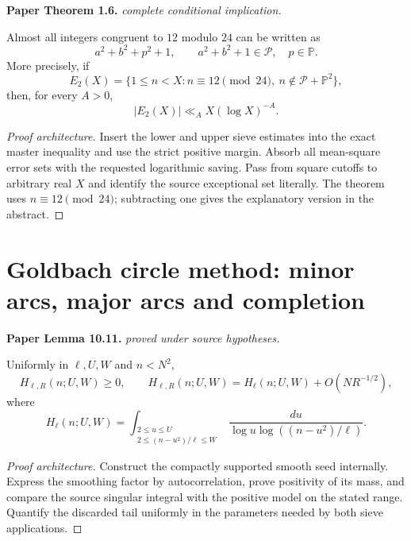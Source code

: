 \begin{theorem}
\label{goldbach_exceptional_set}
\leanok
\par\medskip\noindent\textbf{Paper Theorem 1.6.} \textit{complete conditional implication.}\par
Almost all integers congruent to $12$ modulo $24$ can be written as
\[
 a^2+b^2+p^2+1,
 \qquad a^2+b^2+1\in\mathcal P,\quad p\in\mathbb P.
\]
More precisely, if
\[
 E_2(X)=\{1\leq n<X:n\equiv12\pmod{24},\
 n\notin\mathcal P+\mathbb P^2\},
\]
then, for every $A>0$,
\[
 |E_2(X)|\ll_A X(\log X)^{-A}.
\]
\end{theorem}
\begin{proof}[Proof architecture]
\leanok
Insert the lower and upper sieve estimates into the exact master inequality and use the strict positive margin. Absorb all mean-square error sets with the requested logarithmic saving. Pass from square cutoffs to arbitrary real $X$ and identify the source exceptional set literally. The theorem uses $n\equiv12\pmod{24}$; subtracting one gives the explanatory version in the abstract.
\end{proof}

\section{Goldbach circle method: minor arcs, major arcs and completion}

\begin{lemma}
\label{goldbach_singular_integral}
\uses{}
\leanok
\par\medskip\noindent\textbf{Paper Lemma 10.11.} \textit{proved under source hypotheses.}\par
Uniformly in \(\ell,U,W\) and \(n<N^2\),
\[
 H_{\ell,R}(n;U,W)\geq0,
 \qquad
 H_{\ell,R}(n;U,W)
 =
 H_\ell(n;U,W)+O(NR^{-1/2}),
\]
where
\[
 H_\ell(n;U,W)
 =
 \int_{\substack{2\leq u\leq U\\
 2\leq(n-u^2)/\ell\leq W}}
 \frac{du}{\log u\log((n-u^2)/\ell)}.
\]
\end{lemma}
\begin{proof}[Proof architecture]
\uses{}
\leanok
Construct the compactly supported smooth seed internally. Express the smoothing factor by autocorrelation, prove positivity of its mass, and compare the source singular integral with the positive model on the stated range. Quantify the discarded tail uniformly in the parameters needed by both sieve applications.
\end{proof}

